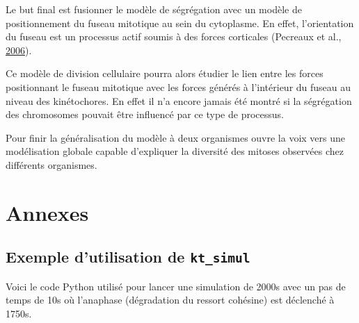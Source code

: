 \documentclass[12pt,a4paper,twoside,openright]{book}
\begin{document}
Le but final est fusionner le modèle de ségrégation avec un modèle de
positionnement du fuseau mitotique au sein du cytoplasme. En effet,
l'orientation du fuseau est un processus actif soumis à des forces
corticales (Pecreaux et al.,
\protect\hyperlink{ref-Pecreaux2006a}{2006}).

Ce modèle de division cellulaire pourra alors étudier le lien entre les
forces positionnant le fuseau mitotique avec les forces générés à
l'intérieur du fuseau au niveau des kinétochores. En effet il n'a encore
jamais été montré si la ségrégation des chromosomes pouvait être
influencé par ce type de processus.

Pour finir la généralisation du modèle à deux organismes ouvre la voix
vers une modélisation globale capable d'expliquer la diversité des
mitoses observées chez différents organismes.

\clearpage\null

\appendix

\chapter{Annexes}\label{annexes}

\section{\texorpdfstring{Exemple d'utilisation de
\texttt{kt\_simul}}{Exemple d'utilisation de kt\_simul}}\label{exemple-dutilisation-de-ktux5fsimul}

\label{sec:ktsimul}

Voici le code Python utilisé pour lancer une simulation de 2000s avec un
pas de temps de 10s où l'anaphase (dégradation du ressort cohésine) est
déclenché à 1750s.
\end{document}
